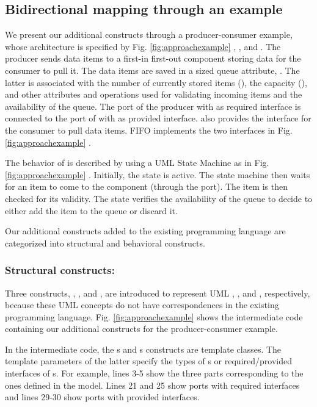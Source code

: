 \subsection{Bidirectional mapping through an example}
We present our additional constructs through a producer-consumer example, whose architecture is specified by Fig. \ref{fig:approachexample} , , and .
The  producer sends data items to a first-in first-out component  storing data for the consumer to pull it.
The data items are saved in a sized queue attribute, .
The latter is associated with the number of currently stored items (), the capacity (), and other attributes and operations used for validating incoming items and the availability of the queue.
The  port of the producer with  as required interface is connected to the  port of  with  as provided interface. %
 also provides the  interface for the consumer to pull data items.
FIFO implements the two interfaces in Fig. \ref{fig:approachexample} .

The behavior of  is described by using a UML State Machine as in Fig. \ref{fig:approachexample} .
Initially, the  state is active.
The state machine then waits for an item to come to the  component (through the  port).
The item is then checked for its validity.
The  state verifies the availability of the queue to decide to either add the item to the queue or discard it.

Our additional constructs added to the existing programming language are categorized into structural and behavioral constructs.


\subsubsection{Structural constructs:}
Three constructs, , , and , are introduced to represent UML , , and , respectively, because these UML concepts do not have correspondences in the existing programming language.
Fig. \ref{fig:approachexample}  shows the intermediate code containing our additional constructs for the producer-consumer example.

In the intermediate code, the s and s constructs are template classes.
The template parameters of the latter specify the types of s or required/provided interfaces of s.
For example, lines 3-5 show the three parts corresponding to the ones defined in the model.
Lines 21 and 25 show ports with required interfaces and lines 29-30 show ports with provided interfaces.

